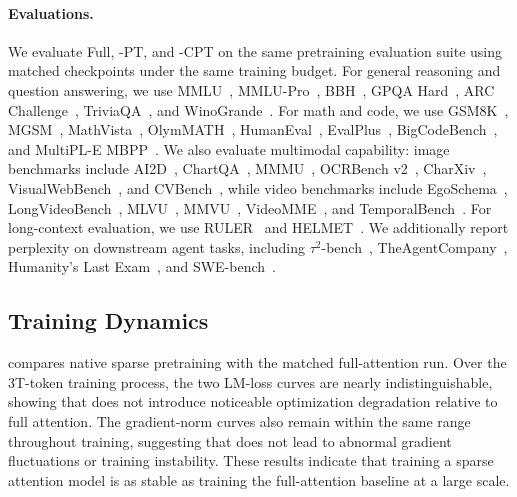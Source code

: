 \paragraph{Evaluations.} We evaluate Full, \method{}-PT, and \method{}-CPT on the same pretraining evaluation suite using matched checkpoints under the same training budget. For general reasoning and question answering, we use MMLU~\citep{hendrycks2021measuring}, MMLU-Pro~\citep{NEURIPS2024_ad236edc}, BBH~\citep{suzgun2022challengingbigbenchtaskschainofthought}, GPQA Hard~\citep{rein2023gpqa}, ARC Challenge~\citep{clark2018thinksolvedquestionanswering}, TriviaQA~\citep{joshi-etal-2017-triviaqa}, and WinoGrande~\citep{Sakaguchi_2020}. For math and code, we use GSM8K~\citep{cobbe2021trainingverifierssolvemath}, MGSM~\citep{shi2022languagemodelsmultilingualchainofthought}, MathVista~\citep{lu2024mathvista}, OlymMATH~\citep{sun2025olymmath}, HumanEval~\citep{chen2021evaluatinglargelanguagemodels}, EvalPlus~\citep{NEURIPS2023_43e9d647}, BigCodeBench~\citep{zhuo2025bigcodebench}, and MultiPL-E MBPP~\citep{cassano2023multipl}. We also evaluate multimodal capability: image benchmarks include AI2D~\citep{kembhavi2016ai2d}, ChartQA~\citep{masry-etal-2022-chartqa}, MMMU~\citep{yue2024mmmu}, OCRBench v2~\citep{fu2025ocrbenchv2improvedbenchmark}, CharXiv~\citep{wang2024charxiv}, VisualWebBench~\citep{liu2024visualwebbench}, and CVBench~\citep{NEURIPS2024_9ee3a664}, while video benchmarks include EgoSchema~\citep{mangalam2023egoschema}, LongVideoBench~\citep{NEURIPS2024_329ad516}, MLVU~\citep{Zhou_2025_CVPR}, MMVU~\citep{zhao2025mmvu}, VideoMME~\citep{fu2024videomme}, and TemporalBench~\citep{cai2024temporalbenchbenchmarkingfinegrainedtemporal}. For long-context evaluation, we use RULER~\citep{hsieh2024ruler} and HELMET~\citep{yen2025helmet}. We additionally report perplexity on downstream agent tasks, including $\tau^2$-bench~\citep{barres2025tau2}, TheAgentCompany~\citep{xu2024theagentcompany}, Humanity's Last Exam~\citep{phan2025hle}, and SWE-bench~\citep{jimenez2024swebench}.


\subsection{Training Dynamics}
\label{sec:experiment-training-dynamics}

 compares native sparse pretraining with the matched full-attention run. Over the 3T-token training process, the two LM-loss curves are nearly indistinguishable, showing that \method{} does not introduce noticeable optimization degradation relative to full attention. The gradient-norm curves also remain within the same range throughout training, suggesting that \method{} does not lead to abnormal gradient fluctuations or training instability. These results indicate that training a sparse attention model is as stable as training the full-attention baseline at a large scale.

